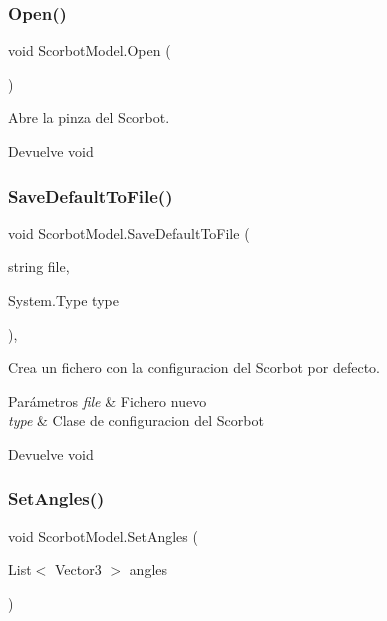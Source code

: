 \subsubsection{\texorpdfstring{Open()}{Open()}}
{\footnotesize\ttfamily void Scorbot\+Model.\+Open (\begin{DoxyParamCaption}{ }\end{DoxyParamCaption})\hspace{0.3cm}{\ttfamily [inline]}}

Abre la pinza del Scorbot. \begin{DoxyReturn}{Devuelve}
void 
\end{DoxyReturn}
\mbox{\label{class_scorbot_model_a3d2cb7f4874da87c692f35da06decb46}} 
\subsubsection{\texorpdfstring{SaveDefaultToFile()}{SaveDefaultToFile()}}
{\footnotesize\ttfamily void Scorbot\+Model.\+Save\+Default\+To\+File (\begin{DoxyParamCaption}\item[{string}]{file,  }\item[{System.\+Type}]{type }\end{DoxyParamCaption})\hspace{0.3cm}{\ttfamily [inline]}, {\ttfamily [private]}}

Crea un fichero con la configuracion del Scorbot por defecto. 
\begin{DoxyParams}{Parámetros}
{\em file} & Fichero nuevo \\
\hline
{\em type} & Clase de configuracion del Scorbot \\
\hline
\end{DoxyParams}
\begin{DoxyReturn}{Devuelve}
void 
\end{DoxyReturn}
\mbox{\label{class_scorbot_model_a74549ede37f30edafb1dbf07c0730cdd}} 
\subsubsection{\texorpdfstring{SetAngles()}{SetAngles()}}
{\footnotesize\ttfamily void Scorbot\+Model.\+Set\+Angles (\begin{DoxyParamCaption}\item[{List$<$ Vector3 $>$}]{angles }\end{DoxyParamCaption})\hspace{0.3cm}{\ttfamily [inline]}}

